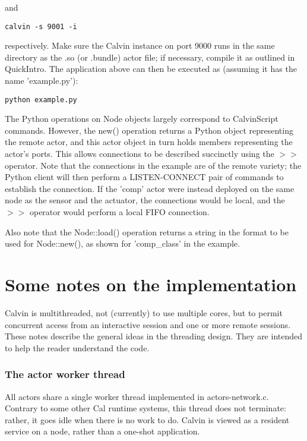 \documentclass[10pt, a4paper]{article}
\begin{document}
and

\begin{verbatim}
calvin -s 9001 -i
\end{verbatim}

respectively. Make sure the Calvin instance on port 9000 runs in the
same directory as the .so (or .bundle) actor file; if necessary, compile it as
outlined in QuickIntro. The application above can then be executed as
(assuming it has the name 'example.py'):

\begin{verbatim}
python example.py
\end{verbatim}

The Python operations on Node objects largely correspond to
CalvinScript commands. However, the new() operation returns a Python
object representing the remote actor, and this actor object in turn
holds members representing the actor's ports. This allows connections
to be described succinctly using the $>>$ operator. Note that the
connections in the example are of the remote variety; the Python
client will then perform a LISTEN-CONNECT pair of commands to
establish the connection. If the 'comp' actor were instead deployed on
the same node as the sensor and the actuator, the connections would be
local, and the $>>$ operator would perform a local FIFO connection.

Also note that the Node::load() operation returns a string in the
format to be used for Node::new(), as shown for 'comp\_class' in the
example.

\section{Some notes on the implementation}

Calvin is multithreaded, not (currently) to use multiple cores, but to
permit concurrent access from an interactive session and one or more
remote sessions. These notes describe the general ideas in the
threading design. They are intended to help the reader understand the code.

\subsubsection*{The actor worker thread}

All actors share a single worker thread implemented in actors-network.c. Contrary to some other Cal runtime systems, this thread does not terminate: rather, it goes idle when there is no work to do. Calvin is viewed as a resident service on a node, rather than a one-shot application.
\end{document}
